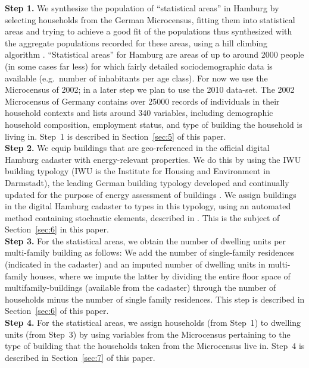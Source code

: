 \documentclass[11pt]{IJM-article}
\begin{document}
\textbf{Step 1.} We synthesize the population of ``statistical areas'' in
Hamburg by selecting households from the German Microcensus, fitting them into
statistical areas and trying to achieve a good fit of the populations thus
synthesized with the aggregate populations recorded for these areas, using a
hill climbing algorithm \cite{Williamson.1998}. ``Statistical areas'' for
Hamburg are areas of up to around 2000 people (in some cases far less) for
which fairly detailed sociodemographic data is available (e.g.\ number of
inhabitants per age class). For now we use the Microcensus of 2002; in a later
step we plan to use the 2010 data-set. The 2002 Microcensus of Germany contains
over 25000 records of individuals in their household contexts and lists around
340 variables, including demographic household composition, employment status,
and type of building the household is living in. Step~1 is described in
Section~\ref{sec:5} of this paper.\\

\textbf{Step 2.} We equip buildings that are geo-referenced in the official
digital Hamburg cadaster with energy-relevant properties. We do this by using
the IWU building typology (IWU is the Institute for Housing and Environment in
Darmstadt), the leading German building typology developed and continually
updated for the purpose of energy assessment of buildings . We
assign buildings in the digital Hamburg cadaster to types in this typology,
using an automated method containing stochastic elements, described in
. This is the subject of Section~\ref{sec:6} in this
paper.\\

\textbf{Step 3.} For the statistical areas, we obtain the number of dwelling
units per multi-family building as follows: We add the number of single-family
residences (indicated in the cadaster) and an imputed number of dwelling units
in multi-family houses, where we impute the latter by dividing the entire floor
space of multifamily-buildings (available from the cadaster) through the number
of households minus the number of single family residences. This step is
described in Section~\ref{sec:6} of this paper.\\

\textbf{Step 4.} For the statistical areas, we assign households (from Step~1)
to dwelling units (from Step~3) by using variables from the Microcensus
pertaining to the type of building that the households taken from the
Microcensus live in. Step~4 is described in Section~\ref{sec:7} of this
paper.\\
\end{document}
